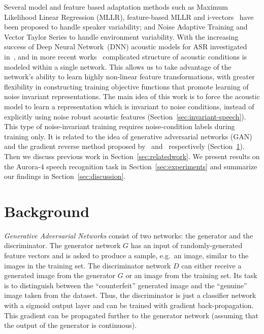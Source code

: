 \documentclass[a4paper]{article}
\begin{document}
    Several model and feature based adaptation methods such as Maximum 
    Likelihood Linear Regression (MLLR),  feature-based MLLR and 
    i-vectors~\citep{saon2013speaker} have been proposed to handle speaker 
    variability; and Noise Adaptive Training \citep[NAT;][]{kalinli2010noise}
    and Vector Taylor Series \citep[VTS;][]{un1998speech} to handle 
    environment variability.
    With the increasing success of Deep Neural 
    Network~(DNN) acoustic models for ASR investigated 
    in~\citep{hinton2012deep,seide2011conversational,sainath2011making}, 
    and in more recent works~\citep{miao2015eesen,sainath2015learning} 
    complicated structure of acoustic conditions is modeled within a single network.
    This allows us to take 
    advantage of the network's ability to learn highly non-linear feature 
    transformations, with greater flexibility in constructing training 
    objective functions that promote learning of noise invariant 
    representations.
    The main idea of this work is to force the acoustic model 
    to learn a representation which is invariant to noise conditions, instead of 
    explicitly using noise robust acoustic features 
    (Section~\ref{sec:invariant-speech}). This type of noise-invariant 
    training requires noise-condition labels during training only. It is 
    related to the idea of generative adversarial networks (GAN) and the 
    gradient reverse method proposed by~\cite{goodfellow2014generative} 
    and~\cite{ganin2014unsupervised} respectively 
    (Section~\ref{sec:background}). Then we discuss previous work in 
    Section~\ref{sec:relatedwork}. 
    We present results on the Aurora-4 speech 
    recognition task in Section~\ref{sec:experiments} and summarize 
    our findings in Section~\ref{sec:discussion}.

\section{Background}
\label{sec:background}
\emph{Generative Adversarial Networks} consist of two networks: the generator and the discriminator. 
    The generator network $G$ has an
    input of randomly-generated feature vectors and is asked to produce a
    sample, e.g.\ an image, similar to the images in the training set. The discriminator network $D$
    can either receive a generated image from the generator $G$ or an image
    from the training set. Its task is to distinguish
    between the ``counterfeit'' generated image and the ``genuine'' image taken from the dataset. Thus,
    the discriminator is just a classifier network with a sigmoid output layer
    and can be trained with gradient back-propagation. This gradient can be propagated further
    to the generator network (assuming that the output of the generator is
    continuous).
\end{document}
